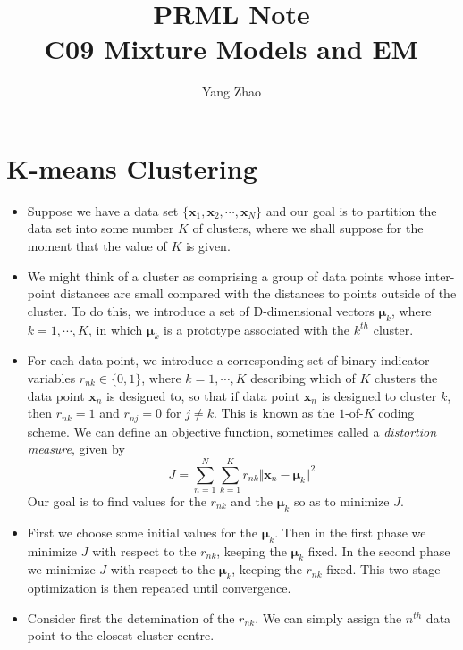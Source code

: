 \documentclass[12pt, a4paper]{article}
\title{PRML Note\\C09 Mixture Models and EM}
\author{Yang Zhao}
\affil{Department of Automation, Tsinghua University}
\date{}
\begin{document}
    \maketitle
    \section{K-means Clustering}
    \begin{itemize}
        \item Suppose we have a data set $\{\bm{x}_1,\bm{x}_2,\cdots,\bm{x}_N\}$ and 
        our goal is to partition the data set into some number $K$ of clusters, where
        we shall suppose for the moment that the value of $K$ is given.
        \item We might think of a cluster as comprising a group of data points whose
        inter-point distances are small compared with the distances to points outside
        of the cluster. To do this, we introduce a set of D-dimensional vectors 
        $\bm{\mu}_k$, where $k=1,\cdots,K$, in which $\bm{\mu}_k$ is a prototype 
        associated with the $k^{th}$ cluster.
        \item For each data point, we introduce a corresponding set of binary indicator
        variables $r_{nk}\in\{ 0,1\}$, where $k=1,\cdots,K$ describing which of $K$
        clusters the data point $\bm{x}_n$ is designed to, so that if data point 
        $\bm{x}_n$ is designed to cluster $k$, then $r_{nk}=1$ and $r_{nj}=0$ for 
        $j\neq k$. This is known as the $1$-of-$K$ coding scheme. We can define an 
        objective function, sometimes called a \textit{distortion measure}, given by
        \begin{equation}
            J=\sum_{n=1}^N\sum_{k=1}^K r_{nk}\Vert\bm{x}_n-\bm{\mu}_k\Vert^2
        \end{equation}
        Our goal is to find values for the $r_{nk}$ and the $\bm{\mu}_k$ so as to 
        minimize $J$.
        \item First we choose some initial values for the $\bm{\mu}_k$. Then in the 
        first phase we minimize $J$ with respect to the $r_{nk}$, keeping the 
        $\bm{\mu}_k$ fixed. In the second phase we minimize $J$ with respect to the 
        $\bm{\mu}_k$, keeping the $r_{nk}$ fixed. This two-stage optimization is then 
        repeated until convergence. 
        \item Consider first the detemination of the $r_{nk}$. We can simply assign the
        $n^{th}$ data point to the closest cluster centre.
        \begin{equation}

\end{equation}
\end{itemize}
\end{document}
